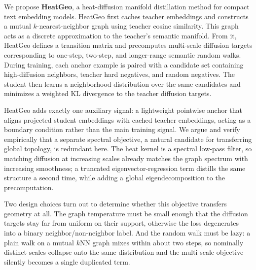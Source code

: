We propose \textbf{HeatGeo}, a heat-diffusion manifold distillation method for compact text embedding models. HeatGeo first caches teacher embeddings and constructs a mutual $k$-nearest-neighbor graph using teacher cosine similarity. This graph acts as a discrete approximation to the teacher's semantic manifold. From it, HeatGeo defines a transition matrix and precomputes multi-scale diffusion targets corresponding to one-step, two-step, and longer-range semantic random walks. During training, each anchor example is paired with a candidate set containing high-diffusion neighbors, teacher hard negatives, and random negatives. The student then learns a neighborhood distribution over the same candidates and minimizes a weighted KL divergence to the teacher diffusion targets.

HeatGeo adds exactly one auxiliary signal: a lightweight pointwise anchor that aligns projected student embeddings with cached teacher embeddings, acting as a boundary condition rather than the main training signal. We argue and verify empirically that a separate spectral objective, a natural candidate for transferring global topology, is redundant here. The heat kernel is a spectral low-pass filter, so matching diffusion at increasing scales already matches the graph spectrum with increasing smoothness; a truncated eigenvector-regression term distills the same structure a second time, while adding a global eigendecomposition to the precomputation.

Two design choices turn out to determine whether this objective transfers geometry at all. The graph temperature must be small enough that the diffusion targets stay far from uniform on their support, otherwise the loss degenerates into a binary neighbor/non-neighbor label. And the random walk must be lazy: a plain walk on a mutual $k$NN graph mixes within about two steps, so nominally distinct scales collapse onto the same distribution and the multi-scale objective silently becomes a single duplicated term.

